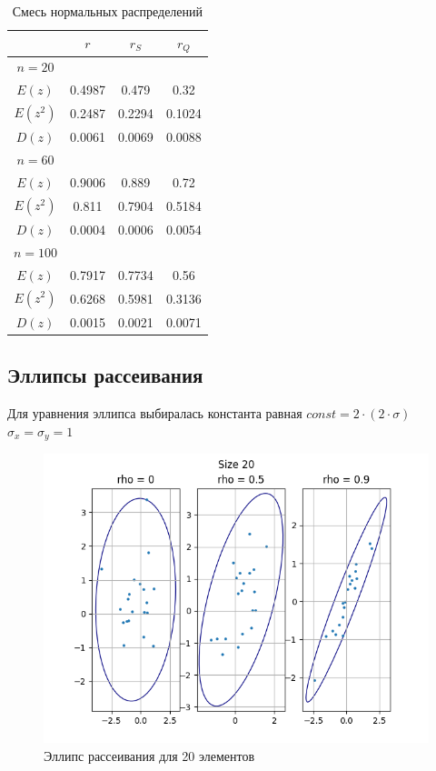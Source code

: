 \documentclass[a4paper,14pt]{article}
\begin{document}
	\begin{table}[H]
		\centering
		\begin{tabular}{|c|c|c|c|}
			\hline
			& $r$ & $r_S$ & $r_Q$\\\hline
			$n=20$ & & &\\\hline
			$E(z)$ & 0.4987 & 0.479 & 0.32\\\hline
			$E(z^2)$ & 0.2487 & 0.2294 & 0.1024\\\hline
			$D(z)$ & 0.0061 & 0.0069 & 0.0088\\\hline
			\hline
			$n=60$ & & &\\\hline
			$E(z)$ & 0.9006 & 0.889 & 0.72\\\hline
			$E(z^2)$ & 0.811 & 0.7904 & 0.5184\\\hline
			$D(z)$ & 0.0004 & 0.0006 & 0.0054\\\hline
			\hline
			$n=100$ & & &\\\hline
			$E(z)$ & 0.7917 & 0.7734 & 0.56\\\hline
			$E(z^2)$ & 0.6268 & 0.5981 & 0.3136\\\hline
			$D(z)$ & 0.0015 & 0.0021 & 0.0071\\\hline
		\end{tabular}
		\caption{Смесь нормальных распределений}
	\end{table}
	
	\subsection{Эллипсы рассеивания}
	Для уравнения эллипса выбиралась константа равная $const = 2 \cdot (2 \cdot \sigma)$\\
	$\sigma_x=\sigma_y=1$
	\begin{figure}[H]
		\centering
		\includegraphics[scale=0.85]{../image/lab5_20.png}
		\caption{Эллипс рассеивания для 20 элементов}
	\end{figure}
	
\end{document}
